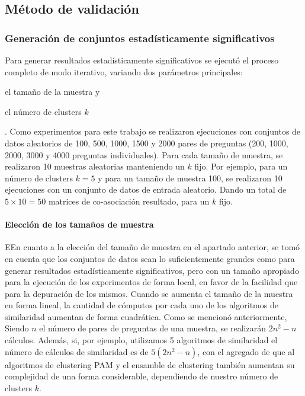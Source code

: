 \subsection{Método de validación}\label{metodo-validacion}

\subsubsection{Generación de conjuntos estadísticamente significativos}

Para generar resultados estadísticamente significativos se ejecutó el proceso completo de modo iterativo, variando dos parámetros principales: \begin{enumerate*} [label=(\roman*)] \item el tamaño de la muestra y \item el número de clusters \(k\)\end{enumerate*}. Como experimentos para este trabajo se realizaron ejecuciones con conjuntos de datos aleatorios de 100, 500, 1000, 1500 y 2000 pares de preguntas (200, 1000, 2000, 3000 y 4000 preguntas individuales). Para cada tamaño de muestra, se realizaron 10 muestras aleatorias manteniendo un \(k\) fijo. Por ejemplo, para un número de clusters \(k = 5\) y para un tamaño de muestra 100, se realizaron 10 ejecuciones con un conjunto de datos de entrada aleatorio. Dando un total de \(5 \times 10 = 50\) matrices de co-asociación resultado, para un \(k\) fijo.

\paragraph{Elección de los tamaños de muestra}
EEn cuanto a la elección del tamaño de muestra en el apartado anterior, se tomó en cuenta que los conjuntos de datos sean lo suficientemente grandes como para generar resultados estadísticamente significativos, pero con un tamaño apropiado para la ejecución de los experimentos de forma local, en favor de la facilidad que para la depuración de los mismos. Cuando se aumenta el tamaño de la muestra en forma lineal, la cantidad de cómputos por cada uno de los algoritmos de similaridad aumentan de forma cuadrática. Como se mencionó anteriormente, Siendo \(n\) el número de pares de preguntas de una muestra, se realizarán \(2n^2-n\) cálculos. Además, si, por ejemplo, utilizamos 5 algoritmos de similaridad el número de cálculos de similaridad es de \(5(2n^2-n)\), con el agregado de que al algoritmos de clustering PAM y el ensamble de clustering también aumentan su complejidad de una forma considerable, dependiendo de nuestro número de clusters \(k\).

